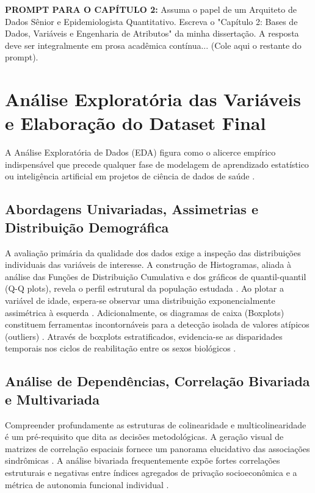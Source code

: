 \documentclass[12pt,openright,oneside,a4paper,brazil]{abntex2}
\begin{document}
\begin{mdframed}[backgroundcolor=gray!10]
\textbf{PROMPT PARA O CAPÍTULO 2:} Assuma o papel de um Arquiteto de Dados Sênior e Epidemiologista Quantitativo. Escreva o "Capítulo 2: Bases de Dados, Variáveis e Engenharia de Atributos" da minha dissertação. A resposta deve ser integralmente em prosa acadêmica contínua... (Cole aqui o restante do prompt).
\end{mdframed}

\chapter{Análise Exploratória das Variáveis e Elaboração do Dataset Final}

A Análise Exploratória de Dados (EDA) figura como o alicerce empírico indispensável que precede qualquer fase de modelagem de aprendizado estatístico ou inteligência artificial em projetos de ciência de dados de saúde \cite{ref31, ref32, ref33}.

\section{Abordagens Univariadas, Assimetrias e Distribuição Demográfica}
A avaliação primária da qualidade dos dados exige a inspeção das distribuições individuais das variáveis de interesse. A construção de Histogramas, aliada à análise das Funções de Distribuição Cumulativa e dos gráficos de quantil-quantil (Q-Q plots), revela o perfil estrutural da população estudada \cite{ref31, ref32}. Ao plotar a variável de idade, espera-se observar uma distribuição exponencialmente assimétrica à esquerda \cite{ref4, ref7}. Adicionalmente, os diagramas de caixa (Boxplots) constituem ferramentas incontornáveis para a detecção isolada de valores atípicos (outliers) \cite{ref31, ref32}. Através de boxplots estratificados, evidencia-se as disparidades temporais nos ciclos de reabilitação entre os sexos biológicos \cite{ref6, ref7, ref34}.

\section{Análise de Dependências, Correlação Bivariada e Multivariada}
Compreender profundamente as estruturas de colinearidade e multicolinearidade é um pré-requisito que dita as decisões metodológicas. A geração visual de matrizes de correlação espaciais fornece um panorama elucidativo das associações sindrômicas \cite{ref12, ref31}. A análise bivariada frequentemente expõe fortes correlações estruturais e negativas entre índices agregados de privação socioeconômica e a métrica de autonomia funcional individual \cite{ref1, ref6, ref7}. 
\end{document}
